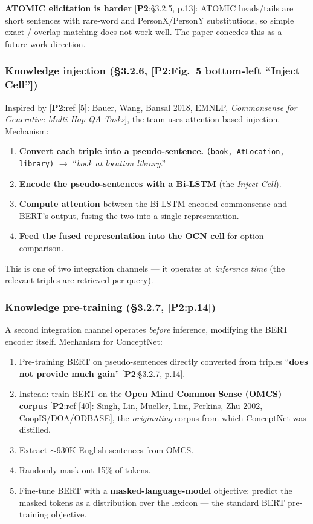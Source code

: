 \documentclass[11pt, a4paper]{article}
\newcommand{\paperref}[1]{\textcolor{srcBd}{\small[\textbf{P2}:#1]}}
\begin{document}
\textbf{ATOMIC elicitation is harder} \paperref{§3.2.5, p.13}: ATOMIC heads/tails are short sentences with rare-word and PersonX/PersonY substitutions, so simple exact / overlap matching does not work well. The paper concedes this as a future-work direction.

\subsubsection*{Knowledge injection (§3.2.6, \paperref{Fig.\ 5 bottom-left ``Inject Cell''})}
Inspired by \paperref{ref [5]: Bauer, Wang, Bansal 2018, EMNLP, \emph{Commonsense for Generative Multi-Hop QA Tasks}}, the team uses attention-based injection. Mechanism:
\begin{enumerate}
  \item \textbf{Convert each triple into a pseudo-sentence.} \texttt{(book, AtLocation, library)} \(\to\) ``\emph{book at location library}.''
  \item \textbf{Encode the pseudo-sentences with a Bi-LSTM} (the \emph{Inject Cell}).
  \item \textbf{Compute attention} between the Bi-LSTM-encoded commonsense and BERT's output, fusing the two into a single representation.
  \item \textbf{Feed the fused representation into the OCN cell} for option comparison.
\end{enumerate}

This is one of two integration channels — it operates at \emph{inference time} (the relevant triples are retrieved per query).

\subsubsection*{Knowledge pre-training (§3.2.7, \paperref{p.14})}
A second integration channel operates \emph{before} inference, modifying the BERT encoder itself. Mechanism for ConceptNet:
\begin{enumerate}
  \item Pre-training BERT on pseudo-sentences directly converted from triples ``\textbf{does not provide much gain}'' \paperref{§3.2.7, p.14}.
  \item Instead: train BERT on the \textbf{Open Mind Common Sense (OMCS) corpus} \paperref{ref [40]: Singh, Lin, Mueller, Lim, Perkins, Zhu 2002, CoopIS/DOA/ODBASE}, the \emph{originating} corpus from which ConceptNet was distilled.
  \item Extract \(\sim\)930K English sentences from OMCS.
  \item Randomly mask out 15\% of tokens.
  \item Fine-tune BERT with a \textbf{masked-language-model} objective: predict the masked tokens as a distribution over the lexicon — the standard BERT pre-training objective.
\end{enumerate}
\end{document}
